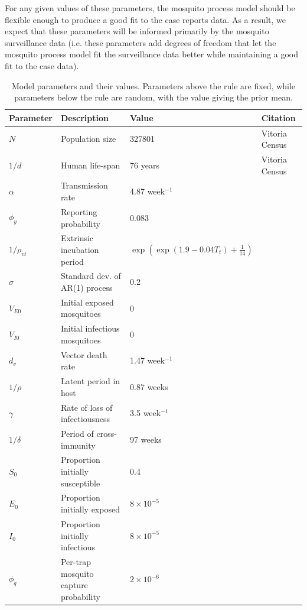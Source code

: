 \documentclass[10pt,letterpaper]{article}
\begin{document}
For any given values of these parameters, the mosquito process model should be flexible enough to produce a good fit to the case reports data.
As a result, we expect that these parameters will be informed primarily by the mosquito surveillance data (i.e. these parameters add degrees of freedom that let the mosquito process model fit the surveillance data better while maintaining a good fit to the case data).

\begin{table}[!ht]
\label{fixedparms}
\begin{adjustwidth}{-2.25in}{0in} 
\begin{center}
\caption{Model parameters and their values.  Parameters above the rule are fixed, while parameters below the rule are random, with the value giving the prior mean.}
\begin{tabular}{llll}
Parameter & Description & Value & Citation\\
\hline
$N$ & Population size & 327801 & Vitoria Census\\
$1/d$ & Human life-span & 76 years & Vitoria Census\\
$\alpha$ & Transmission rate & 4.87 week$^{-1}$ & \cite{Scott2000}\\
$\phi_y$ & Reporting probability & 0.083 & \cite{Silva2016}\\
$1/\rho_{vt}$ & Extrinsic incubation period & $\exp \left(\exp(1.9 - 0.04 T_t) + \frac{1}{14}\right)$ & \cite{Chan2012}\\
$\sigma$  & Standard dev. of AR(1) process & 0.2 & \\
$V_{E0}$ & Initial exposed mosquitoes &  0 & \\
$V_{I0}$ & Initial infectious mosquitoes & 0 & \\
\hline
$d_v$ & Vector death rate & 1.47 week$^{-1}$ & \cite{Brady2013} \\
$1/\rho$ & Latent period in host & 0.87 weeks  & \cite{Chan2012}\\
$\gamma$ & Rate of loss of infectiousness & 3.5 week$^{-1}$ & \cite{Nguyet2013}\\
$1/\delta$ & Period of cross-immunity & 97 weeks &  \cite{Reich2013}\\
$S_0$ & Proportion initially susceptible & 0.4 & \cite{Cardoso2011a} \\
$E_0$ & Proportion initially exposed & $8\times 10 ^ {-5}$ & \\
$I_0$ & Proportion initially infectious & $8\times 10 ^ {-5}$ & \\
$\phi_q$ & Per-trap mosquito capture probability & $2 \times 10^{-6}$ & 
\end{tabular}
\end{center}
\end{adjustwidth}
\end{table}
\end{document}
